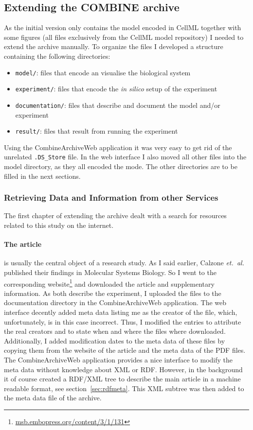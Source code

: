 \subsection{Extending the COMBINE archive}
As the initial version only contains the model encoded in CellML together with some figures (all files exclusively from the CellML model repository) I needed to extend the archive manually.
To organize the files I developed a structure containing the following directories:
\begin{itemize}
 \item \texttt{model/}: files that encode an visualise the biological system
 \item \texttt{experiment/}: files that encode the \textit{in silico} setup of the experiment
 \item \texttt{documentation/}: files that describe and document the model and/or experiment
 \item \texttt{result/}: files that result from running the experiment
\end{itemize}

Using the CombineArchiveWeb application it was very easy to get rid of the unrelated \texttt{.DS\_Store} file. In the web interface I also moved all other files into the model directory, as they all encoded the mode.
The other directories are to be filled in the next sections.

\subsubsection{Retrieving Data and Information from other Services}
The first chapter of extending the archive dealt with a search for resources related to this study on the internet.

\paragraph{The article} is usually the central object of a research study. As I said earlier, Calzone \emph{et.~al.} published their findings in Molecular Systems Biology. So I went to the corresponding website\footnote{\href{http://msb.embopress.org/content/3/1/131}{msb.embopress.org/content/3/1/131}} and downloaded the article and supplementary information.
As both describe the experiment, I uploaded the files to the documentation directory in the CombineArchiveWeb application.
The web interface decently added meta data listing me as the creator of the file, which, unfortunately, is in this case incorrect.
Thus, I modified the entries to attribute the real creators and to state when and where the files where downloaded.
Additionally, I added modification dates to the meta data of these files by copying them from the website of the article and the meta data of the PDF files.
The CombineArchiveWeb application provides a nice interface to modify the meta data without knowledge about XML or RDF.
However, in the background it of course created a RDF/XML tree to describe the main article in a machine readable format, see section~\ref{sec:rdfmeta}.
This XML subtree was then added to the meta data file of the archive.


